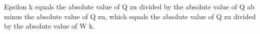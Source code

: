 Epsilon k equals the absolute value of Q zu divided by the absolute value of Q ab minus the absolute value of Q zu, which equals the absolute value of Q zu divided by the absolute value of W k.